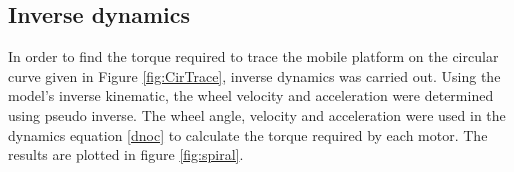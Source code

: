 {\subsection{Inverse dynamics}
\label{sec:InvDynamics_NoSlip}
In order to find the torque required to trace the mobile platform on the circular curve given in Figure \ref{fig:CirTrace}, inverse dynamics was carried out.
Using the model's inverse kinematic,  the wheel velocity and acceleration were determined using pseudo inverse.  %
The wheel angle, velocity and acceleration were used in the dynamics equation \ref{dnoc}  to calculate the torque required by each motor. The results are plotted in figure \ref{fig:spiral}. 

}
